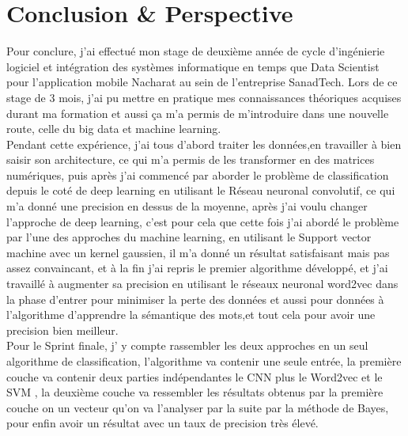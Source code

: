 \chapter*{Conclusion \& Perspective} %
Pour conclure, j’ai effectué mon stage de deuxième année de cycle d'ingénierie logiciel et intégration des systèmes informatique  en temps que Data Scientist pour l'application mobile Nacharat au sein de l’entreprise SanadTech. Lors de ce stage de 3 mois, j’ai pu mettre en pratique mes connaissances théoriques acquises durant ma formation et aussi ça m'a permis de m'introduire dans une nouvelle route, celle du big data et machine learning.\\[0.5cm]
Pendant cette expérience, j'ai tous d'abord traiter les données,en travailler à bien  saisir son architecture, ce qui m'a permis de les transformer en des matrices numériques, puis après j'ai commencé par aborder le problème de classification depuis le coté de deep learning en utilisant le Réseau neuronal convolutif, ce qui m'a donné une precision en dessus de la moyenne, après j'ai voulu changer l'approche de deep learning, c'est pour cela que cette fois j'ai abordé le problème  par l'une des approches du machine learning, en utilisant le Support vector machine avec un kernel gaussien, il m'a donné un résultat satisfaisant mais pas assez convaincant, et à la fin j'ai repris le premier algorithme développé, et j'ai travaillé à augmenter sa precision en utilisant le réseaux neuronal word2vec dans la phase d'entrer pour minimiser la perte des données et aussi pour données à l'algorithme d'apprendre la sémantique des mots,et tout cela pour avoir une precision bien meilleur.\\[0.5cm]
Pour le Sprint finale, j' y compte rassembler les deux approches en un seul algorithme de classification, l'algorithme va contenir une seule entrée, la première couche va contenir deux parties indépendantes le CNN plus le Word2vec et le SVM , la deuxième couche va ressembler les résultats obtenus par la première couche on un vecteur qu'on va l'analyser par la suite par la méthode de Bayes, pour enfin avoir un résultat avec un taux de precision très élevé.
